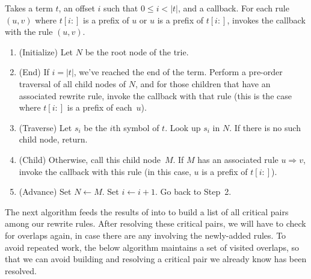 \documentclass[../generics]{subfiles}
\begin{document}
\begin{algorithm}\label{overlap trie lookup}
Takes a term $t$, an offset $i$ such that $0\leq i<|t|$, and a callback. For each rule $(u, v)$ where $t[i:]$ is a prefix of $u$ or $u$ is a prefix of $t[i:]$, invokes the callback with the rule $(u, v)$.
\begin{enumerate}
\item (Initialize) Let $N$ be the root node of the trie.
\item (End) If $i=|t|$, we've reached the end of the term. Perform a pre-order traversal of all child nodes of $N$, and for those children that have an associated rewrite rule, invoke the callback with that rule (this is the case where $t[i:]$ is a prefix of each~$u$).
\item (Traverse) Let $s_i$ be the $i$th symbol of $t$. Look up $s_i$ in $N$. If there is no such child node, return.
\item (Child) Otherwise, call this child node~$M$. If $M$ has an associated rule $u\Rightarrow v$, invoke the callback with this rule (in this case, $u$ is a prefix of $t[i:]$).
\item (Advance) Set $N \leftarrow M$. Set $i \leftarrow i+1$. Go back to Step~2.
\end{enumerate}
\end{algorithm}

The next algorithm feeds the results of  into  to build a list of all critical pairs among our rewrite rules. After resolving these critical pairs, we will have to check for overlaps again, in case there are any involving the newly-added rules. To avoid repeated work,  the below algorithm maintains a set of visited overlaps, so that we can avoid building and resolving a critical pair we already know has been resolved.
\end{document}
